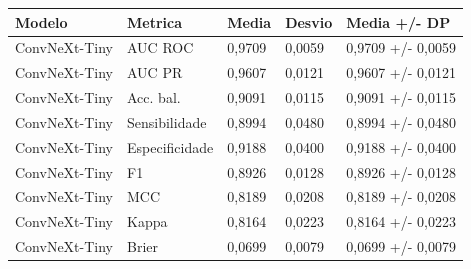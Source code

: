 \begin{tabular}{lllll}
\toprule
Modelo & Metrica & Media & Desvio & Media +/- DP \\
\midrule
ConvNeXt-Tiny & AUC ROC & 0,9709 & 0,0059 & 0,9709 +/- 0,0059 \\
ConvNeXt-Tiny & AUC PR & 0,9607 & 0,0121 & 0,9607 +/- 0,0121 \\
ConvNeXt-Tiny & Acc. bal. & 0,9091 & 0,0115 & 0,9091 +/- 0,0115 \\
ConvNeXt-Tiny & Sensibilidade & 0,8994 & 0,0480 & 0,8994 +/- 0,0480 \\
ConvNeXt-Tiny & Especificidade & 0,9188 & 0,0400 & 0,9188 +/- 0,0400 \\
ConvNeXt-Tiny & F1 & 0,8926 & 0,0128 & 0,8926 +/- 0,0128 \\
ConvNeXt-Tiny & MCC & 0,8189 & 0,0208 & 0,8189 +/- 0,0208 \\
ConvNeXt-Tiny & Kappa & 0,8164 & 0,0223 & 0,8164 +/- 0,0223 \\
ConvNeXt-Tiny & Brier & 0,0699 & 0,0079 & 0,0699 +/- 0,0079 \\
\bottomrule
\end{tabular}
